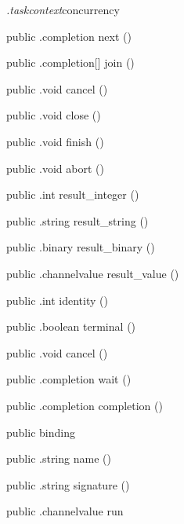 \begin{CrexxClass}{\textit{.taskcontext}}{concurrency}
\begin{Members}
    \Method
      {public}
      {.completion}
      {next}
      {()}

    \Method
      {public}
      {.completion[]}
      {join}
      {()}

    \Method
      {public}
      {.void}
      {cancel}
      {()}

    \Method
      {public}
      {.void}
      {close}
      {()}

    \Method
      {public}
      {.void}
      {finish}
      {()}

    \Method
      {public}
      {.void}
      {abort}
      {()}

    \Method
      {public}
      {.int}
      {result\_integer}
      {()}

    \Method
      {public}
      {.string}
      {result\_string}
      {()}

    \Method
      {public}
      {.binary}
      {result\_binary}
      {()}

    \Method
      {public}
      {.channelvalue}
      {result\_value}
      {()}

    \Method
      {public}
      {.int}
      {identity}
      {()}

    \Method
      {public}
      {.boolean}
      {terminal}
      {()}

    \Method
      {public}
      {.void}
      {cancel}
      {()}

    \Method
      {public}
      {.completion}
      {wait}
      {()}

    \Method
      {public}
      {.completion}
      {completion}
      {()}

    \Factory
      {public}
      {binding}
      {}

    \Method
      {public}
      {.string}
      {name}
      {()}

    \Method
      {public}
      {.string}
      {signature}
      {()}

    \Method
      {public}
      {.channelvalue}
      {run}
      {}


\end{Members}
\end{CrexxClass}
